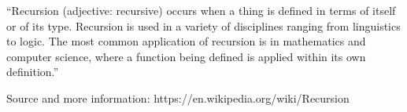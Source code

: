 
``Recursion (adjective: recursive) occurs when a thing is defined in terms of itself or of its type.
Recursion is used in a variety of disciplines ranging from linguistics to logic.
The most common application of recursion is in mathematics and computer science,
where a function being defined is applied within its own definition.''

Source and more information: https://en.wikipedia.org/wiki/Recursion

